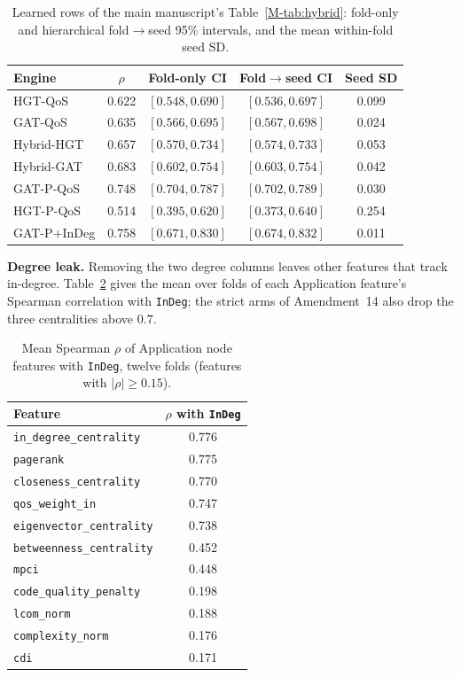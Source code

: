 \begin{table}[htbp]
\centering
\scriptsize
\caption{Learned rows of the main manuscript's Table~\ref{M-tab:hybrid}: fold-only and hierarchical fold$\to$seed 95\% intervals, and the mean within-fold seed SD.}
\label{tab:r8-hier}
\begin{tabular}{lcccc}
\toprule
Engine & $\rho$ & Fold-only CI & Fold$\to$seed CI & Seed SD \\
\midrule
HGT-QoS & 0.622 & $[0.548, 0.690]$ & $[0.536, 0.697]$ & 0.099 \\
GAT-QoS & 0.635 & $[0.566, 0.695]$ & $[0.567, 0.698]$ & 0.024 \\
Hybrid-HGT & 0.657 & $[0.570, 0.734]$ & $[0.574, 0.733]$ & 0.053 \\
Hybrid-GAT & 0.683 & $[0.602, 0.754]$ & $[0.603, 0.754]$ & 0.042 \\
GAT-P-QoS & 0.748 & $[0.704, 0.787]$ & $[0.702, 0.789]$ & 0.030 \\
HGT-P-QoS & 0.514 & $[0.395, 0.620]$ & $[0.373, 0.640]$ & 0.254 \\
GAT-P+InDeg & 0.758 & $[0.671, 0.830]$ & $[0.674, 0.832]$ & 0.011 \\
\bottomrule
\end{tabular}
\end{table}

\noindent\textbf{Degree leak.} Removing the two degree columns leaves other features that track in-degree. Table~\ref{tab:r8-leak} gives the mean over folds of each Application feature's Spearman correlation with \texttt{InDeg}; the strict arms of Amendment~14 also drop the three centralities above $0.7$.

\begin{table}[htbp]
\centering
\scriptsize
\caption{Mean Spearman $\rho$ of Application node features with \texttt{InDeg}, twelve folds (features with $|\rho| \ge 0.15$).}
\label{tab:r8-leak}
\begin{tabular}{lc}
\toprule
Feature & $\rho$ with \texttt{InDeg} \\
\midrule
\texttt{in\_degree\_centrality} & 0.776 \\
\texttt{pagerank} & 0.775 \\
\texttt{closeness\_centrality} & 0.770 \\
\texttt{qos\_weight\_in} & 0.747 \\
\texttt{eigenvector\_centrality} & 0.738 \\
\texttt{betweenness\_centrality} & 0.452 \\
\texttt{mpci} & 0.448 \\
\texttt{code\_quality\_penalty} & 0.198 \\
\texttt{lcom\_norm} & 0.188 \\
\texttt{complexity\_norm} & 0.176 \\
\texttt{cdi} & 0.171 \\
\bottomrule
\end{tabular}
\end{table}

